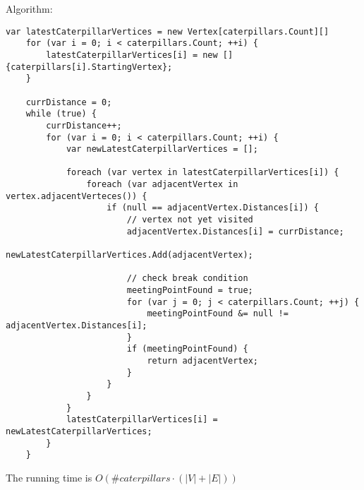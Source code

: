 \documentclass[12pt, a4]{article}
\begin{document}
\pagebreak
 Algorithm:
 \begin{lstlisting}[language={[Sharp]c}] 
	var latestCaterpillarVertices = new Vertex[caterpillars.Count][]
 	for (var i = 0; i < caterpillars.Count; ++i) {
 		latestCaterpillarVertices[i] = new [] {caterpillars[i].StartingVertex};
 	}
 	
 	currDistance = 0;
	while (true) {
 		currDistance++;
	 	for (var i = 0; i < caterpillars.Count; ++i) {
	 		var newLatestCaterpillarVertices = [];
	 		
			foreach (var vertex in latestCaterpillarVertices[i]) {
				foreach (var adjacentVertex in vertex.adjacentVerteces()) {
					if (null == adjacentVertex.Distances[i]) {
						// vertex not yet visited
						adjacentVertex.Distances[i] = currDistance;
						newLatestCaterpillarVertices.Add(adjacentVertex);
						
						// check break condition
						meetingPointFound = true;
						for (var j = 0; j < caterpillars.Count; ++j) {
							meetingPointFound &= null != adjacentVertex.Distances[i];						
						}
						if (meetingPointFound) {
							return adjacentVertex;
						}
					}
				}
			}
			latestCaterpillarVertices[i] = newLatestCaterpillarVertices;
		}
	}
 \end{lstlisting}

The running time is $O(\#caterpillars \cdot (|V| + |E|))$
\end{document}
